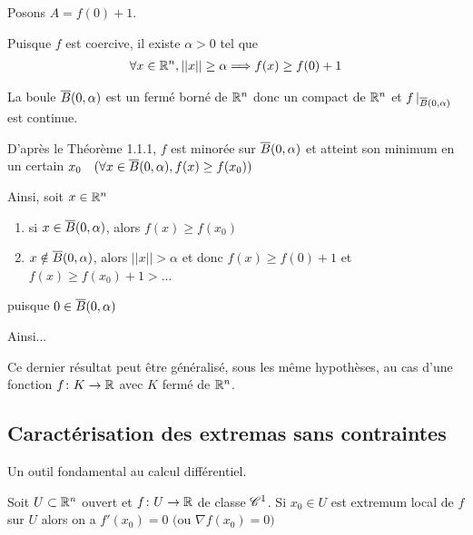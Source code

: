 \documentclass[french,a4paper,10pt]{article}
\begin{document}
	\begin{oc-proof}
		Posons $A=f(0)+1$.
		
		Puisque $f$ est coercive, il existe $\alpha>0$ tel que
			\[\begin{aligned}
				\forall x\in\mathbb{R}^n,||x||\ge\alpha\Longrightarrow f(x)\ge f(0)+1
			\end{aligned}\]
		
		La boule $\overline{B}(0, \alpha)$ est un fermé borné de $\mathbb{R}^n$ donc un compact de $\mathbb{R}^n$ et $f\mathop{}\!|_{\overline{B}(0, \alpha)}$ est continue.
		
		D'après le Théorème 1.1.1, $f$ est minorée sur $\overline{B}(0, \alpha)$ et atteint son minimum en un certain $x_0\quad(\forall x\in \overline{B}(0, \alpha), f(x)\ge f(x_0))$
		
		Ainsi, soit $x\in \mathbb{R}^n$
		\begin{enumerate}[label=$a\\$]
			\item si $x\in \overline{B}(0, \alpha)$, alors $f(x)\ge f(x_0)$
			\item $x\notin \overline{B}(0, \alpha)$, alors $||x||>\alpha$ et donc $f(x)\ge f(0)+1$ et $f(x)\ge f(x_0)+1>$...
		\end{enumerate}
	
		puisque $0\in \overline{B}(0, \alpha)$
		
		Ainsi...
		
	\end{oc-proof}

	\begin{oc-remark}
		Ce dernier résultat peut être généralisé, sous les même hypothèses, au cas d'une fonction $f\colon K\to\mathbb{R}$ avec $K$ fermé de $\mathbb{R}^n$.
		
	\end{oc-remark}

	\subsection{Caractérisation des extremas sans contraintes}
	
	Un outil fondamental au calcul différentiel.
	
	\begin{oc-theorem}
		Soit $U\subset \mathbb{R}^n$ ouvert et $f\colon U\to\mathbb{R}$ de classe $\mathscr{C}^1$. Si $x_0\in U$ est extremum local de $f$ sur $U$ alors on a $f'(x_0)=0$ $($ou $\nabla f(x_0)=0)$
		
	\end{oc-theorem}
\end{document}
